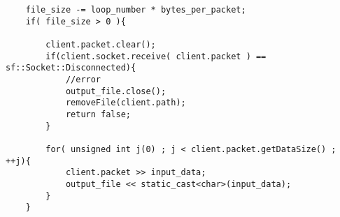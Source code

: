 \begin{lstlisting}
    file_size -= loop_number * bytes_per_packet;
    if( file_size > 0 ){
        
        client.packet.clear();
        if(client.socket.receive( client.packet ) == sf::Socket::Disconnected){
            //error
            output_file.close();
            removeFile(client.path);
            return false;
        }

        for( unsigned int j(0) ; j < client.packet.getDataSize() ; ++j){
            client.packet >> input_data;
            output_file << static_cast<char>(input_data);
        }
    }
\end{lstlisting}